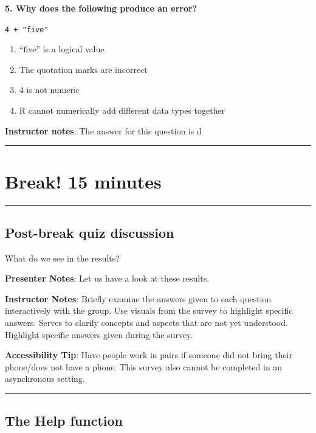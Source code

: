\documentclass[
  letterpaper,
  DIV=11,
  numbers=noendperiod]{scrartcl}
\providecommand{\tightlist}{%
  \setlength{\itemsep}{0pt}\setlength{\parskip}{0pt}}
\begin{document}
\textbf{5. Why does the following produce an error?}

\texttt{4\ +\ "five"}

\begin{enumerate}
\def\labelenumi{\alph{enumi}.}
\tightlist
\item
  ``five'' is a logical value
\item
  The quotation marks are incorrect
\item
  4 is not numeric
\item
  R cannot numerically add different data types together
\end{enumerate}

\textbf{Instructor notes}: The answer for this question is d

\begin{center}\rule{0.5\linewidth}{0.5pt}\end{center}

\section{Break! 15 minutes}\label{break-15-minutes}

\begin{center}\rule{0.5\linewidth}{0.5pt}\end{center}

\subsection{Post-break quiz
discussion}\label{post-break-quiz-discussion}

What do we see in the results?

\textbf{Presenter Notes}: Let us have a look at these results.

\textbf{Instructor Notes}: Briefly examine the answers given to each
question interactively with the group. Use visuals from the survey to
highlight specific answers. Serves to clarify concepts and aspects that
are not yet understood. Highlight specific answers given during the
survey.

\textbf{Accessibility Tip}: Have people work in pairs if someone did not
bring their phone/does not have a phone. This survey also cannot be
completed in an asynchronous setting.

\begin{center}\rule{0.5\linewidth}{0.5pt}\end{center}

\subsection{The Help function}\label{the-help-function}
\end{document}
